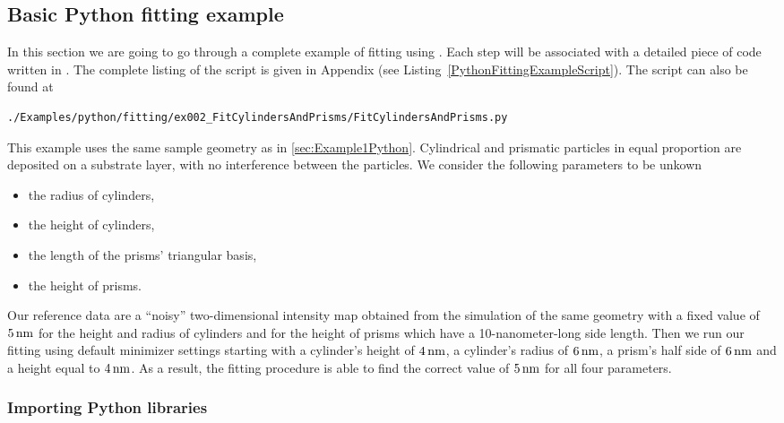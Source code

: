 \subsection{Basic Python fitting example} \label{sec:FittingExamples}

In this section we are going to go through a complete example of
fitting using \BornAgain. Each  step will be associated with a
detailed piece of code written in \Python.
The complete listing of
the script is given in Appendix (see Listing~\ref{PythonFittingExampleScript}).
The script can also be found at
\begin{lstlisting}[language=shell, style=commandline]
./Examples/python/fitting/ex002_FitCylindersAndPrisms/FitCylindersAndPrisms.py
\end{lstlisting}

\noindent
This example uses the same sample geometry as in \cref{sec:Example1Python}.
Cylindrical and
prismatic particles in equal proportion are deposited on a substrate layer, with no interference
between the particles. We consider the following parameters to be unkown
\begin{itemize}
\item the radius of cylinders,
\item the height of cylinders,
\item the length of the prisms' triangular basis,
\item the height of prisms.
\end{itemize}

Our reference data are a ``noisy'' two-dimensional intensity
map obtained from the simulation of the same geometry with a fixed
value of $5\,{\rm nm}$ for the height and radius of cylinders and for the
height of prisms which have a 10-nanometer-long side length.
Then we run our fitting using default minimizer settings
starting with a cylinder's height
of $4\,{\rm nm}$, a cylinder's radius of $6\,{\rm nm}$,
a prism's half side of $6\,{\rm nm}$ and a height equal to $4\,{\rm nm}$.
As a result, the fitting procedure is able to find the correct value of $5\,{\rm nm}$
for all four parameters.


\subsubsection*{Importing Python libraries}

